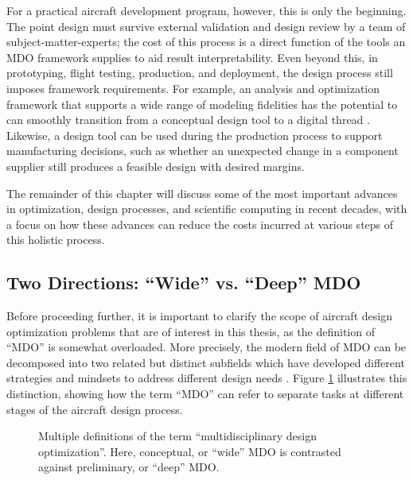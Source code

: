 For a practical aircraft development program, however, this is only the beginning. The point design must survive external validation and design review by a team of subject-matter-experts; the cost of this process is a direct function of the tools an MDO framework supplies to aid result interpretability. Even beyond this, in prototyping, flight testing, production, and deployment, the design process still imposes framework requirements. For example, an analysis and optimization framework that supports a wide range of modeling fidelities has the potential to can smoothly transition from a conceptual design tool to a digital thread \cite{niederer_scaling_2021, singh_engineering_2018}. Likewise, a design tool can be used during the production process to support manufacturing decisions, such as whether an unexpected change in a component supplier still produces a feasible design with desired margins.

The remainder of this chapter will discuss some of the most important advances in optimization, design processes, and scientific computing in recent decades, with a focus on how these advances can reduce the costs incurred at various steps of this holistic process.

\subsection{Two Directions: ``Wide'' vs. ``Deep'' MDO}
\label{sec:wide_vs_deep}

Before proceeding further, it is important to clarify the scope of aircraft design optimization problems that are of interest in this thesis, as the definition of ``MDO'' is somewhat overloaded. More precisely, the modern field of MDO can be decomposed into two related but distinct subfields which have developed different strategies and mindsets to address different design needs \cite{piperni_development_2013}. Figure \ref{fig:mdo_overloaded_term} illustrates this distinction, showing how the term ``MDO'' can refer to separate tasks at different stages of the aircraft design process.

\begin{figure}[H]
    \centering
    \caption{Multiple definitions of the term ``multidisciplinary design optimization''. Here, conceptual, or ``wide'' MDO is contrasted against preliminary, or ``deep'' MDO.}
    \label{fig:mdo_overloaded_term}
\end{figure}

